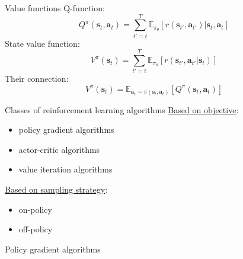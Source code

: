 \documentclass{beamer}
\begin{document}
\begin{frame}{Value functions}
		Q-function:
\begin{equation*}
		\label{eq:q-function}
		Q^\pi (\bm{s}_t, \bm{a}_t) = \sum_{t'=t}^{T} \mathbb{E}_{\pi_\theta}
		\left[ r(\bm{s}_{t'}, \bm{a}_{t'} )| \bm{s}_t, \bm{a}_t \right] 
\end{equation*}
State value function:
\begin{equation*}
		\label{eq:value-function}
		V^\pi (\bm{s}_t) = \sum_{t'=t}^{T} \mathbb{E}_{\pi_\theta}
		\left[ r(\bm{s}_{t'}, \bm{a}_{t'} | \bm{s}_t) \right] 
\end{equation*}
Their connection:
\begin{equation*}
		V^\pi (\bm{s}_t) = \mathbb{E}_{\bm{a}_t \sim \pi(\bm{s}_t, \bm{a}_t)}
		\left[ Q^\pi(\bm{s}_t, \bm{a}_t) \right] 
\end{equation*}

\end{frame}

\begin{frame}{Classes of reinforcement learning algorithms}
		\underline{Based on objective}:
	\begin{itemize}
			\item policy gradient algorithms 
			\item actor-critic algorithms
			\item value iteration algorithms
	\end{itemize}
	\underline{Based on sampling strategy}:
	\begin{itemize}
			\item on-policy
			\item off-policy
	\end{itemize}
\end{frame}

\begin{frame}{Policy gradient algorithms}
		
\end{frame}
\end{document}
